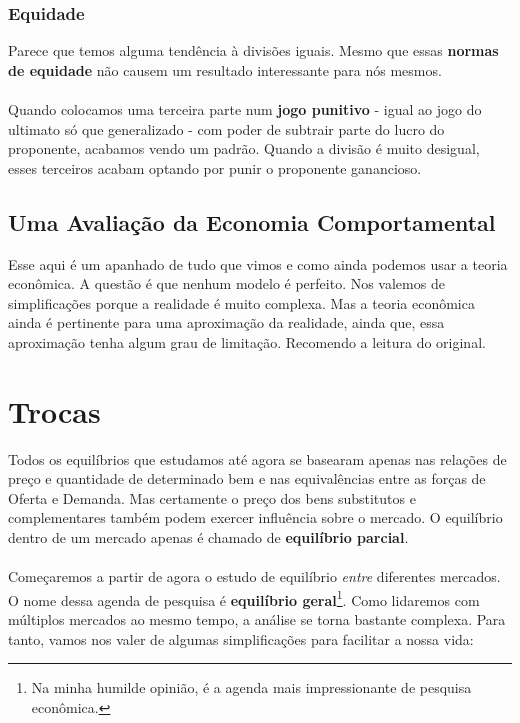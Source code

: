 \documentclass[a4paper,11pt,oneside]{book}
\theoremstyle{definition}
\theoremstyle{break}
\begin{document}
\subsection{Equidade}

Parece que temos alguma tendência à divisões iguais. Mesmo que essas \textbf{normas de equidade} não causem um resultado interessante para nós mesmos.
\\~\\
Quando colocamos uma terceira parte num \textbf{jogo punitivo} - igual ao jogo do ultimato só que generalizado - com poder de subtrair parte do lucro do proponente, acabamos vendo um padrão. Quando a divisão é muito desigual, esses terceiros acabam optando por punir o proponente ganancioso.

\section{Uma Avaliação da Economia Comportamental}

Esse aqui é um apanhado de tudo que vimos e como ainda podemos usar a teoria econômica. A questão é que nenhum modelo é perfeito. Nos valemos de simplificações porque a realidade é muito complexa. Mas a teoria econômica ainda é pertinente para uma aproximação da realidade, ainda que, essa aproximação tenha algum grau de limitação. Recomendo a leitura do original.


\chapter{Trocas}

Todos os equilíbrios que estudamos até agora se basearam apenas nas relações de preço e quantidade de determinado bem e nas equivalências entre as forças de Oferta e Demanda. Mas certamente o preço dos bens substitutos e complementares também podem exercer influência sobre o mercado. O equilíbrio dentro de um mercado apenas é chamado de \textbf{equilíbrio parcial}. 
\\~\\
Começaremos a partir de agora o estudo de equilíbrio \textit{entre} diferentes mercados. O nome dessa agenda de pesquisa é \textbf{equilíbrio geral}\footnote{Na minha humilde opinião, é a agenda mais impressionante de pesquisa econômica.}. Como lidaremos com múltiplos mercados ao mesmo tempo, a análise se torna bastante complexa. Para tanto, vamos nos valer de algumas simplificações para facilitar a nossa vida:
\end{document}
